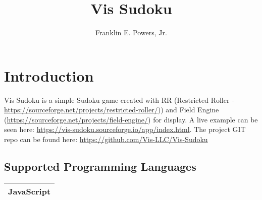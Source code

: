 \documentclass[11pt]{article}
\title{Vis Sudoku}
\author{Franklin E. Powers, Jr.}
\begin{document}
\maketitle

\section{Introduction}
Vis Sudoku is a simple Sudoku game created with RR (Restricted Roller - \href{https://sourceforge.net/projects/restricted-roller/}{https://sourceforge.net/projects/restricted-roller/})) and Field Engine (\href{https://sourceforge.net/projects/field-engine/}{https://sourceforge.net/projects/field-engine/}) for display.  A live example can be seen here: \href{https://vis-sudoku.sourceforge.io/app/index.html}{https://vis-sudoku.sourceforge.io/app/index.html}.  The project GIT repo can be found here: \href{https://github.com/Vis-LLC/Vis-Sudoku}{https://github.com/Vis-LLC/Vis-Sudoku}

\subsection{Supported Programming Languages}
\begin{center}
\begin{tabular}{ | c | }
\hline
JavaScript \\
\hline
\end{tabular}
\end{center}
\end{document}
